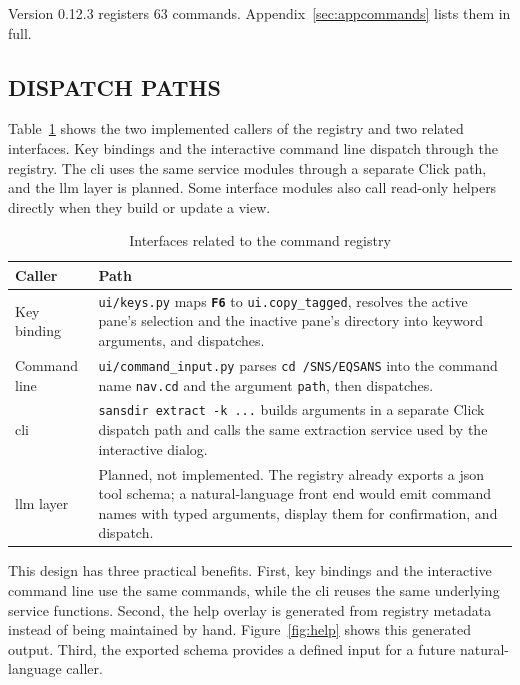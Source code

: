 \documentclass[tm]{ornltm}
\newcommand{\cmd}[1]{\texttt{#1}}
\newcommand{\key}[1]{\textbf{\texttt{#1}}}
\begin{document}
Version 0.12.3 registers 63 commands. Appendix~\ref{sec:appcommands} lists them
in full.

\subsection{DISPATCH PATHS}

Table~\ref{tab:dispatch} shows the two implemented callers of the registry and
two related interfaces. Key bindings and the interactive command line dispatch
through the registry. The \ac{cli} uses the same service modules through a
separate Click path, and the \ac{llm} layer is planned. Some interface modules
also call read-only helpers directly when they build or update a view.

\begin{table}[ht]
  \centering
  \caption{Interfaces related to the command registry}
  \label{tab:dispatch}
  \small
  \begin{tabular}{p{} p{}}
    \toprule
    Caller & Path \\
    \midrule
    Key binding &
      \texttt{ui/keys.py} maps \key{F6} to \cmd{ui.copy\_tagged}, resolves the
      active pane's selection and the inactive pane's directory into keyword
      arguments, and dispatches. \\
    Command line &
      \texttt{ui/command\_input.py} parses \texttt{cd /SNS/EQSANS} into the
      command name \cmd{nav.cd} and the argument \texttt{path}, then
      dispatches. \\
    \Ac{cli} &
      \texttt{sansdir extract -k ...} builds arguments in a separate Click
      dispatch path and calls the same extraction service used by the
      interactive dialog. \\
    \Ac{llm} layer &
      Planned, not implemented. The registry already exports a \ac{json} tool
      schema; a natural-language front end would emit command names with typed
      arguments, display them for confirmation, and dispatch. \\
    \bottomrule
  \end{tabular}
\end{table}

This design has three practical benefits. First, key bindings and the
interactive command line use the same commands, while the \ac{cli} reuses the
same underlying service functions. Second, the help overlay is generated from
registry metadata instead of being maintained by hand.
Figure~\ref{fig:help} shows this generated output. Third, the exported schema
provides a defined input for a future natural-language caller.
\end{document}
